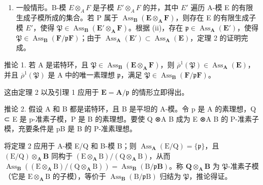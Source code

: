 \begin{enumerate}
\def\labelenumi{(\roman{enumi})}
\setcounter{enumi}{2}
\tightlist
\item
  一般情形。B-模 \(E \otimes_{A} F\) 是子模 \(E' \otimes_{A} F\) 的并，其中 \(E'\) 遍历 A-模 E 的有限生成子模所成的集合。若 P 属于 \(\operatorname{Ass}_{\mathbf{B}}(\mathbf{E} \otimes_{\mathbf{A}} \mathbf{F})\)，则存在 E 的有限生成子模 \(E'\)，使得 \(\mathfrak{P} \in \operatorname{Ass}_{\mathbf{B}}(\mathbf{E}' \otimes_{\mathbf{A}} \mathbf{F})\)。根据 (ii)，存在 \(\mathfrak{p} \in \operatorname{Ass}_{\mathbf{A}}(\mathbf{E}')\)，使得 \(\mathfrak{P} \in \operatorname{Ass}_{\mathbf{B}}(\mathbf{F}/\mathfrak{p}\mathbf{F})\)；由于 \(\operatorname{Ass}_{\mathbf{A}}(\mathbf{E}') \subset \operatorname{Ass}_{\mathbf{A}}(\mathbf{E})\)，定理 2 的证明完成。
\end{enumerate}

推论 1. 若 A 是诺特环，且 \(\mathfrak{P} \in \operatorname{Ass}_{\mathbf{B}}(\mathbf{E} \otimes_{\mathbf{A}} \mathbf{F})\)，则 \(\overline{\rho}^{1}(\mathfrak{P}) \in \operatorname{Ass}_{\mathbf{A}}(\mathbf{E})\)，并且 \(\overline{\rho}^{1}(\mathfrak{P})\) 是 A 中的唯一素理想 \(\mathfrak{p}\)，满足 \(\mathfrak{P} \in \operatorname{Ass}_{\mathbf{B}}(\mathbf{F}/\mathfrak{p}\mathbf{F})\)。

这由定理 2 以及引理 1 应用于 \(\mathbf{E} = \mathbf{A} / \mathfrak{p}\) 的情形立即得出。

推论 2. 假设 A 和 B 都是诺特环，且 B 是平坦的 A-模。令 p 是 A 的素理想，Q ⊂ E 是 p-准素子模，P 是 B 的素理想。要使 Q ⊗A B 成为 E ⊗A B 的 P-准素子模，充要条件是 pB 是 B 的 P-准素理想。

  将定理 2 应用于 A-模 E/Q 和 B-模 B；则 \(\operatorname{Ass}_{\mathbf{A}}(\mathrm{E} / \mathrm{Q}) = \{\mathfrak{p}\}\)，且 \((\mathrm{E} / \mathrm{Q})\otimes_{\mathbf{A}}\mathbf{B}\) 同构于 \((\mathrm{E}\otimes_{\mathbf{A}}\mathrm{B}) / (\mathrm{Q}\otimes_{\mathbf{A}}\mathrm{B})\)，从而 \(\operatorname{Ass}_{\mathbf{B}}((\mathrm{E}\otimes_{\mathbf{A}}\mathrm{B}) / (\mathrm{Q}\otimes_{\mathbf{A}}\mathrm{B})) = \operatorname{Ass}_{\mathbf{B}}(\mathrm{B} / \mathfrak{p}\mathbf{B})\)。称 \(\mathbf{Q}\otimes_{\mathbf{A}}\mathbf{B}\) 为 \(\mathfrak{P}\)-准素子模（它是 \(\mathrm{E}\otimes_{\mathbf{A}}\mathrm{B}\) 的子模），等价于 \(\operatorname{Ass}_{\mathbf{B}}(\mathrm{B} / \mathfrak{p}\mathrm{B})\) 归结为 \(\mathfrak{P}\)，推论得证。

